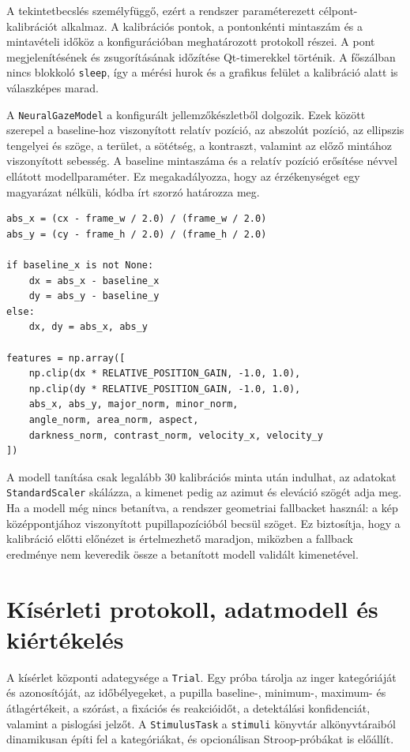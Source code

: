 \documentclass[12pt,a4paper,oneside]{book}
\begin{document}
A tekintetbecslés személyfüggő, ezért a rendszer paraméterezett célpont-kalibrációt alkalmaz. A kalibrációs pontok, a pontonkénti mintaszám és a mintavételi időköz a konfigurációban meghatározott protokoll részei. A pont megjelenítésének és zsugorításának időzítése Qt-timerekkel történik. A főszálban nincs blokkoló \texttt{sleep}, így a mérési hurok és a grafikus felület a kalibráció alatt is válaszképes marad.

A \texttt{NeuralGazeModel} a konfigurált jellemzőkészletből dolgozik. Ezek között szerepel a baseline-hoz viszonyított relatív pozíció, az abszolút pozíció, az ellipszis tengelyei és szöge, a terület, a sötétség, a kontraszt, valamint az előző mintához viszonyított sebesség. A baseline mintaszáma és a relatív pozíció erősítése névvel ellátott modellparaméter. Ez megakadályozza, hogy az érzékenységet egy magyarázat nélküli, kódba írt szorzó határozza meg.

\begin{lstlisting}[caption={Relatív jellemzők képzése a személyes baseline alapján},label={lst:relative_features}]
abs_x = (cx - frame_w / 2.0) / (frame_w / 2.0)
abs_y = (cy - frame_h / 2.0) / (frame_h / 2.0)

if baseline_x is not None:
    dx = abs_x - baseline_x
    dy = abs_y - baseline_y
else:
    dx, dy = abs_x, abs_y

features = np.array([
    np.clip(dx * RELATIVE_POSITION_GAIN, -1.0, 1.0),
    np.clip(dy * RELATIVE_POSITION_GAIN, -1.0, 1.0),
    abs_x, abs_y, major_norm, minor_norm,
    angle_norm, area_norm, aspect,
    darkness_norm, contrast_norm, velocity_x, velocity_y
])
\end{lstlisting}

A modell tanítása csak legalább 30 kalibrációs minta után indulhat, az adatokat \texttt{StandardScaler} skálázza, a kimenet pedig az azimut és eleváció szögét adja meg. Ha a modell még nincs betanítva, a rendszer geometriai fallbacket használ: a kép középpontjához viszonyított pupillapozícióból becsül szöget. Ez biztosítja, hogy a kalibráció előtti előnézet is értelmezhető maradjon, miközben a fallback eredménye nem keveredik össze a betanított modell validált kimenetével.

\section{Kísérleti protokoll, adatmodell és kiértékelés}

A kísérlet központi adategysége a \texttt{Trial}. Egy próba tárolja az inger kategóriáját és azonosítóját, az időbélyegeket, a pupilla baseline-, minimum-, maximum- és átlagértékeit, a szórást, a fixációs és reakcióidőt, a detektálási konfidenciát, valamint a pislogási jelzőt. A \texttt{StimulusTask} a \texttt{stimuli} könyvtár alkönyvtáraiból dinamikusan építi fel a kategóriákat, és opcionálisan Stroop-próbákat is előállít.
\end{document}
